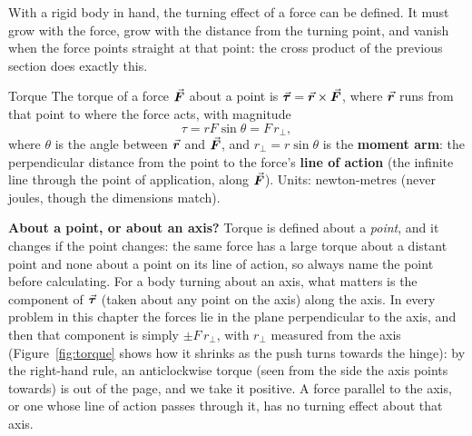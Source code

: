 With a rigid body in hand, the turning effect of a force can be defined. It must grow with the force,
grow with the distance from the turning point, and vanish when the force points straight at that point:
the cross product of the previous section does exactly this.

\begin{defbox}{Torque}
The torque of a force $\vec{\bm{F}}$ about a point is $\vec{\bm{\tau}}=\vec{\bm{r}}\times\vec{\bm{F}}$, where $\vec{\bm{r}}$ runs from that point to where the force acts, with magnitude
\[
\tau=rF\sin\theta=F\,r_\perp,
\]
where $\theta$ is the angle between $\vec{\bm{r}}$ and $\vec{\bm{F}}$, and $r_\perp=r\sin\theta$ is the \textbf{moment arm}: the perpendicular distance from the point to
the force's \textbf{line of action} (the infinite line through the point of application, along $\vec{\bm{F}}$). Units: newton-metres (never joules, though the dimensions match).
\end{defbox}

\textbf{About a point, or about an axis?} Torque is defined about a \emph{point}, and it changes if the
point changes: the same force has a large torque about a distant point and none about a point on its line
of action, so always name the point before calculating. For a body turning about an axis, what matters is
the component of $\vec{\bm{\tau}}$ (taken about any point on the axis) along the axis. In every problem in this
chapter the forces lie in the plane perpendicular to the axis, and then that component is simply
$\pm F\,r_\perp$, with $r_\perp$ measured from the axis (Figure~\ref{fig:torque} shows how it shrinks as the push turns towards the hinge): by the right-hand rule, an anticlockwise torque (seen
from the side the axis points towards) is out of the page, and we take it positive. A force parallel to
the axis, or one whose line of action passes through it, has no turning effect about that axis.

\begin{figure}[htbp]
\centering
{}
\end{figure}

